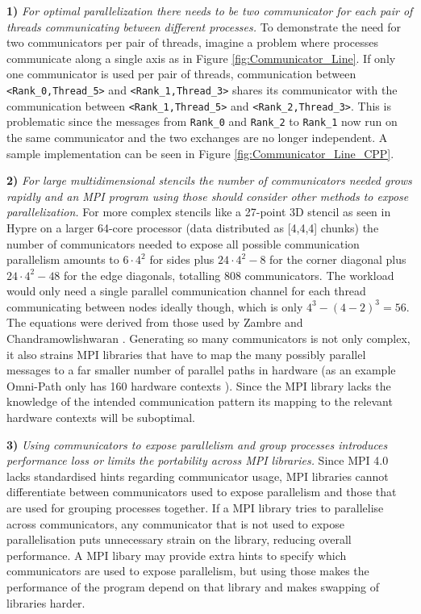 \documentclass[sigconf]{acmart}
\begin{document}
\textbf{1)} \textit{For optimal parallelization there needs to be two communicator for each pair of threads communicating between different processes.}
To demonstrate the need for two communicators per pair of threads, imagine a problem where processes communicate along a single axis as in Figure \ref{fig:Communicator_Line}.
If only one communicator is used per pair of threads, communication between \verb|<Rank_0,Thread_5>| and \verb|<Rank_1,Thread_3>| shares its communicator with the communication between \verb|<Rank_1,Thread_5>| and \verb|<Rank_2,Thread_3>|.
This is problematic since the messages from \verb|Rank_0| and \verb|Rank_2| to \verb|Rank_1| now run on the same communicator and the two exchanges are no longer independent.
A sample implementation can be seen in Figure \ref{fig:Communicator_Line_CPP}.

\textbf{2)} \textit{For large multidimensional stencils the number of communicators needed grows rapidly and an MPI program using those should consider other methods to expose parallelization.}
For more complex stencils like a 27-point 3D stencil as seen in Hypre\cite{hypre2020} on a larger 64-core processor (data distributed as [4,4,4] chunks) the number of communicators needed to expose all possible communication parallelism amounts to $6 \cdot 4^2$ for sides plus $24 \cdot 4^2 - 8$ for the corner diagonal plus $24 \cdot 4^2 - 48$ for the edge diagonals, totalling $808$ communicators.
The workload would only need a single parallel communication channel for each thread communicating between nodes ideally though, which is only $4^3 - (4-2)^3 = 56$.
The equations were derived from those used by Zambre and Chandramowlishwaran \cite{zambreLessonsLearned2022}.
Generating so many communicators is not only complex, it also strains MPI libraries that have to map the many possibly parallel messages to a far smaller number of parallel paths in hardware (as an example Omni-Path only has 160 hardware contexts \cite{intelOmniPath}).
Since the MPI library lacks the knowledge of the intended communication pattern its mapping to the relevant hardware contexts will be suboptimal.

\textbf{3)} \textit{Using communicators to expose parallelism and group processes introduces performance loss or limits the portability across MPI libraries.}
Since MPI 4.0 lacks standardised hints regarding communicator usage, MPI libraries cannot differentiate between communicators used to expose parallelism and those that are used for grouping processes together.
If a MPI library tries to parallelise across communicators, any communicator that is not used to expose parallelisation puts unnecessary strain on the library, reducing overall performance.
A MPI libary may provide extra hints to specify which communicators are used to expose parallelism, but using those makes the performance of the program depend on that library and makes swapping of libraries harder.
\end{document}
